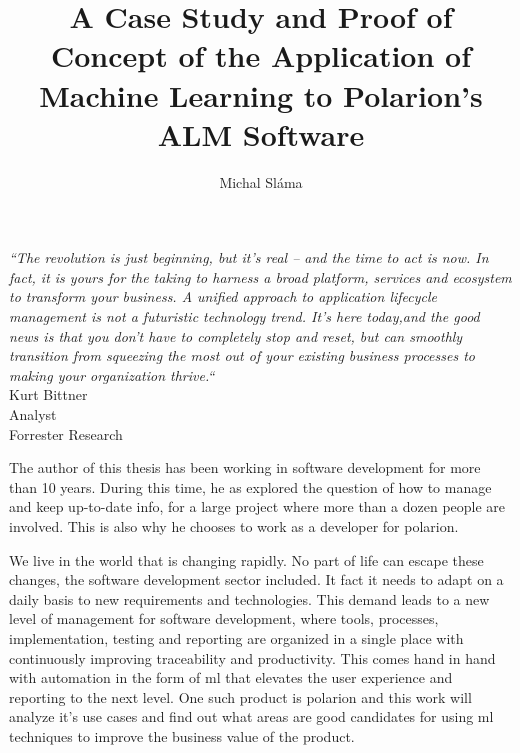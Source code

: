 \documentclass[thesis=M,english]{FITthesis}[2012/06/26]
\title{A Case Study and Proof of Concept of the Application of Machine Learning to Polarion's ALM Software}
\author{Michal Sláma} %
\begin{document}


\begin{introduction}
	\begin{center}
		\textit{“The revolution is just beginning, but it’s real – and the time to act is now. In fact, it is yours for the taking to harness a broad platform, services and ecosystem to transform your business. A unified approach to application lifecycle management is not a futuristic technology trend. It’s here today,and the good news is that you don’t have to completely stop and reset, but can smoothly transition from squeezing the most out of your existing business processes to making your organization thrive.“}\\
		Kurt Bittner\\
		Analyst\\
		Forrester Research\\
	\end{center}
\end{introduction}

The author of this thesis has been working in software development for more than 10 years. During this time, he as explored the question of how to manage and keep up-to-date info, for a large project where more than a dozen people are involved. This is also why he chooses to work as a developer for \acrshort{polarion}.


We live in the world that is changing rapidly. No part of life can escape these changes, the software development sector included. It fact it needs to adapt on a daily basis to new requirements and technologies. This demand leads to a new level of management for software development, where tools, processes, implementation, testing and reporting are organized in a single place with continuously improving traceability and productivity. This comes hand in hand with automation in the form of \acrshort{ml} that elevates the user experience and reporting to the next level. One such product is \acrshort{polarion}\cite{polarion_alm} and this work will analyze it's use cases and find out what areas are good candidates for using \acrshort{ml} techniques to improve the business value of the product. 
\end{document}
